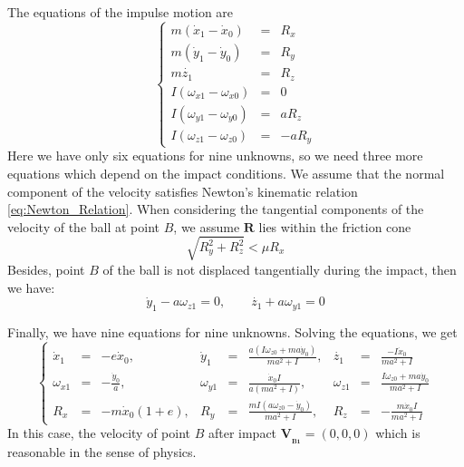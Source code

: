 \documentclass[preprint,12pt]{elsarticle}
\renewcommand{\vec}[1]{\boldsymbol{#1}}
\begin{document}
The equations of the impulse motion are
\begin{equation}
\left\{\begin{array}{rcl}
    m(\dot{x}_1-\dot{x}_0) &= & R_x \\
     m(\dot{y}_1-\dot{y}_0)& = & R_y\\
      m \dot{z_1} & = & R_z\\
    I(\omega_{x1}-\omega_{x0}) & = & 0\\
    I(\omega_{y1}-\omega_{y0}) & = & a R_z\\
    I(\omega_{z1}-\omega_{z0}) & = &-a R_y
\end{array}\right.
\end{equation}
Here we have only six equations for nine unknowns, so we need three more equations which depend on the impact conditions.
We assume that the normal component of the velocity satisfies Newton's kinematic relation \eqref{eq:Newton_Relation}.
When considering the tangential components of the velocity of the ball at point $B$, we assume $\vec{R}$ lies within the friction cone
\begin{equation}
  \sqrt{R_y^2+R_z^2}<\mu R_x
\end{equation}
Besides, point $B$ of the ball is not displaced tangentially during the impact, then we have:
\begin{equation}
  \dot{y}_1-a\omega_{z1}=0,\qquad \dot{z_1}+a \omega_{y1}=0
\end{equation}

Finally, we have nine equations for nine unknowns. Solving the equations, we get
\begin{equation}\label{eq:Result_After_First_Impact}
    \left\{\begin{array}{rclrclrcl}
      \dot{x}_1&=&-e\dot{x}_0,& \dot{y}_1&=&\frac{a\left( I \omega_{z0}+m a \dot{y}_0\right)}{ma^2+I},&\dot{z_1}&=&\frac{-I \dot{x}_0}{m a^2+I}\\[10pt]
    \omega_{x1}&=&-\frac{\dot{y}_0}{a},& \omega_{y1}&=&\frac{\dot{x}_0 I}{a\left(m a^2+I\right)},& \omega_{z1}&=&\frac{I \omega_{z0}+m a \dot{y}_0}{m a^2+I}\\[10pt]
    R_x&=&-m\dot{x}_0 \left(1+e\right),& R_y&=&\frac{m I\left(a\omega_{z0}-\dot{y}_0\right)}{m a^2+I},&R_z&=&-\frac{m \dot{x}_0 I}{m a^2+I}
    \end{array}\right.
\end{equation}
In this case, the velocity of point $B$ after impact $\vec{V_{_{B1}}}=(0,0,0)$ which is reasonable in the sense of physics.
\end{document}

